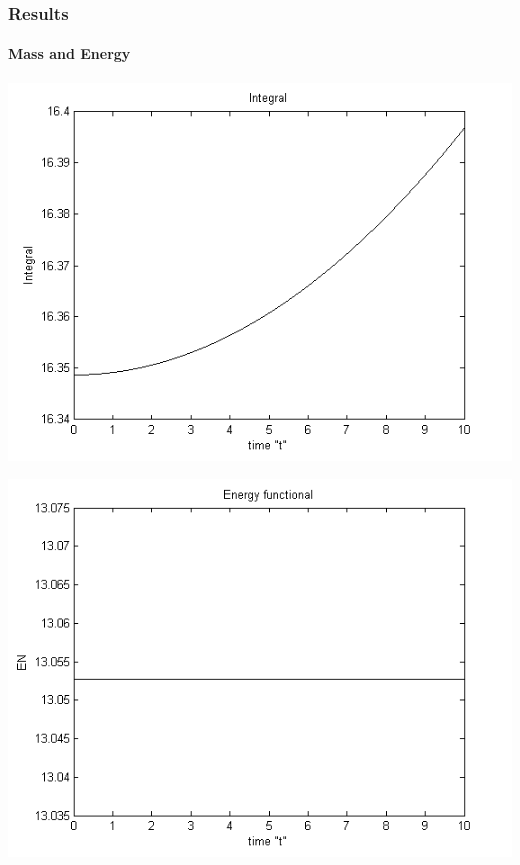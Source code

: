 \documentclass{beamer}
\begin{document}
\begin{frame}
\frametitle{Results}
\framesubtitle{Mass and Energy}

\begin{center}\vspace{0.4cm}
	\begin{minipage}[b]{0.25\linewidth}
		 \includegraphics[width=\linewidth]{figures/Integral.png}
	\end{minipage}	
	\begin{minipage}[b]{0.25\linewidth}
		\includegraphics[width=\linewidth]{figures/Energy.png}
		

\end{minipage}
\end{center}
\end{frame}
\end{document}
